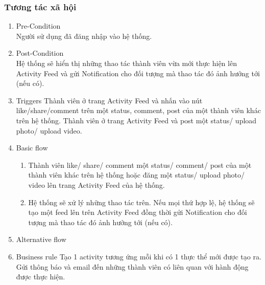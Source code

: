 \subsubsection{Tương tác xã hội}
\begin{enumerate}
	\item Pre-Condition\\
	Người sử dụng đã đăng nhập vào hệ thống.
	\item Post-Condition\\
	Hệ thống sẽ hiển thị những thao tác thành viên vừa mới thực hiện lên Activity Feed và gửi Notification cho đối tượng mà thao tác đó ảnh hưởng tới (nếu có).
	\item Triggers
	Thành viên ở trang Activity Feed và nhấn vào nút like/share/comment trên một status, comment, post của một thành viên khác trên hệ thống. 
	Thành viên ở trang Activity Feed và post một status/ upload photo/ upload video.
	\item Basic flow
	\begin{enumerate}
		\item Thành viên like/ share/ comment một status/ comment/ post của một thành viên khác trên hệ thống hoặc đăng một status/ upload photo/ video lên trang Activity Feed của hệ thống.
		\item Hệ thống sẽ xử lý những thao tác trên. Nếu mọi thứ hợp lệ, hệ thống sẽ tạo một feed lên trên Activity Feed đồng thời gửi Notification cho đối tượng mà thao tác đó ảnh hưởng tới (nếu có).
	\end{enumerate}
	\item Alternative flow
	\item Business rule
	Tạo 1 activity tương ứng mỗi khi có 1 thực thể mới được tạo ra.
	Gửi thông báo và email đến những thành viên có liên quan với hành động được thực hiện.
\end{enumerate}

